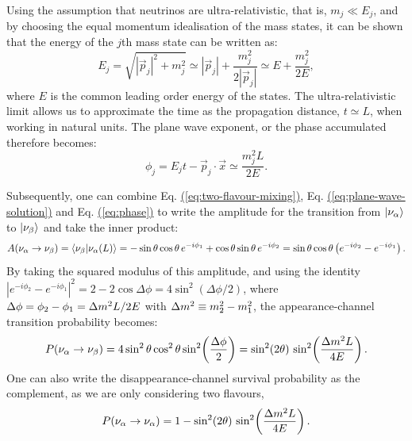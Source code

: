 Using the assumption that neutrinos are ultra-relativistic, that is, $m_j \ll E_j$, and by choosing the equal momentum idealisation of the mass states, it can be shown that the energy of the $j$th mass state can be written as:
\begin{equation}
    E_j = \sqrt{|\vec{p}_j|^{2} + m_j^{2}} \simeq |\vec{p}_j| + \frac{m_j^{2}}{2|\vec{p}_j|} \simeq E + \frac{m_j^{2}}{2E},
    \label{eq:relativistic-expansion}
\end{equation}
where $E$ is the common leading order energy of the states. The ultra-relativistic limit allows us to approximate the time as the propagation distance, $t \simeq L$, when working in natural units. The plane wave exponent, or the phase accumulated therefore becomes:
\begin{equation}
    \phi_j = E_j t - \vec{p}_j\cdot\vec{x} \simeq \frac{m_j^{2}L}{2E}.
    \label{eq:phase}
\end{equation}

Subsequently, one can combine Eq. \hyperref[eq:two-flavour-mixing]{(\ref{eq:two-flavour-mixing})}, Eq. \hyperref[eq:plane-wave-solution]{(\ref{eq:plane-wave-solution})} and Eq. \hyperref[eq:phase]{(\ref{eq:phase})} to write the amplitude for the transition from $\lvert \nu_\alpha \rangle$ to $\lvert \nu_\beta \rangle$ and take the inner product:
\begin{equation}
    A(\nu_\alpha \to \nu_\beta)
    = \langle \nu_\beta | \nu_\alpha(L) \rangle
    = -\sin\theta\cos\theta\, e^{-i\phi_1} + \cos\theta\sin\theta\, e^{-i\phi_2}
    = \sin\theta\cos\theta\left(e^{-i\phi_2} - e^{-i\phi_1}\right).
    \label{eq:amplitude}
\end{equation}
By taking the squared modulus of this amplitude, and using the identity $|e^{-i\phi_2}-e^{-i\phi_1}|^{2} = 2 - 2\cos\Delta\phi = 4\sin^{2}(\Delta\phi/2)$, where $\Delta\phi = \phi_2 - \phi_1 = \Delta m^{2}_{}L/2E$ with $\Delta m^{2}_{} \equiv m_2^{2}-m_1^{2}$, the appearance-channel transition probability becomes:
\begin{equation}
    P(\nu_\alpha \to \nu_\beta)
    = 4\sin^{2}\theta\cos^{2}\theta \sin^{2}\!\left(\frac{\Delta\phi}{2}\right)
    = \sin^{2}(2\theta)\,\sin^{2}\!\left(\frac{\Delta m^{2}_{}L}{4E}\right).
    \label{eq:two-flavour-appearance}
\end{equation}
One can also write the disappearance-channel survival probability as the complement, as we are only considering two flavours,
\begin{equation}
    P(\nu_\alpha \to \nu_\alpha) = 1 - \sin^{2}(2\theta)\,\sin^{2}\!\left(\frac{\Delta m^{2}_{}L}{4E}\right).
    \label{eq:two-flavour-survival}
\end{equation}

